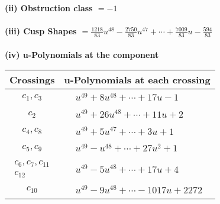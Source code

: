 \documentclass[1p]{elsarticle_modified}
\theoremstyle{definition}
\begin{document}
\flushleft \textbf{(ii) Obstruction class $= -1$}\\~\\
\flushleft \textbf{(iii) Cusp Shapes $= \frac{1218}{83} u^{48}-\frac{2750}{83} u^{47}+\cdots+\frac{7009}{83} u-\frac{594}{83}$}\\~\\
\newpage\renewcommand{\arraystretch}{1}
\flushleft \textbf{(iv) u-Polynomials at the component}\newline \\
\begin{tabular}{m{50pt}|m{274pt}}
Crossings & \hspace{64pt}u-Polynomials at each crossing \\
\hline $$\begin{aligned}c_{1},c_{3}\end{aligned}$$&$\begin{aligned}
&u^{49}+8 u^{48}+\cdots+17 u-1
\end{aligned}$\\
\hline $$\begin{aligned}c_{2}\end{aligned}$$&$\begin{aligned}
&u^{49}+26 u^{48}+\cdots+11 u+2
\end{aligned}$\\
\hline $$\begin{aligned}c_{4},c_{8}\end{aligned}$$&$\begin{aligned}
&u^{49}+5 u^{47}+\cdots+3 u+1
\end{aligned}$\\
\hline $$\begin{aligned}c_{5},c_{9}\end{aligned}$$&$\begin{aligned}
&u^{49}- u^{48}+\cdots+27 u^2+1
\end{aligned}$\\
\hline $$\begin{aligned}c_{6},c_{7},c_{11}\\c_{12}\end{aligned}$$&$\begin{aligned}
&u^{49}-5 u^{48}+\cdots+17 u+4
\end{aligned}$\\
\hline $$\begin{aligned}c_{10}\end{aligned}$$&$\begin{aligned}
&u^{49}-9 u^{48}+\cdots-1017 u+2272
\end{aligned}$\\
\hline
\end{tabular}\\~\\
\end{document}
